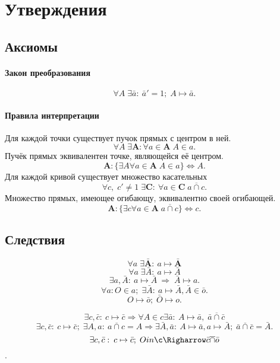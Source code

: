 \section{Утверждения}

\subsection{Аксиомы}
\paragraph{Закон преобразования}
$$\forall A \; \exists \bar a:\: \bar a' =1;\; A \mapsto \bar a.$$

\paragraph{Правила интерпретации}
Для каждой точки существует пучок прямых с центром в ней.
$$\forall A \; \exists \mathbf{A}: \forall a \in \mathbf{A} \; A \in a.$$
Пучёк прямых эквивалентен точке, являющейся её центром.
$$\mathbf{A}:\{ \exists A \forall a \in \mathbf{A} \; A \in a \} \Leftrightarrow A.$$
Для каждой кривой существует множество касательных
$$\forall c,\; c'\ne 1 \; \exists \mathbf{C} :\: \forall a \in \mathbf{C} \; a \overline\cap c.$$
Множество прямых, имеющее огибающу, эквивалентно своей огибающей.
$$\mathbf{A}:\{\exists c \forall a \in \mathbf{A} \; a \overline\cap c\} \Leftrightarrow c.$$

\subsection{Следствия}
$$\forall a \; \exists \mathbf{\bar A} :\: a \mapsto \mathbf{\bar A}$$
$$\forall a \; \exists \bar A: \: a \mapsto \bar A$$
$$\exists a,\bar A: \: a \mapsto \bar A \: \Rightarrow \; \bar A \mapsto a.$$
$$\forall a: O \in a; \; \exists \bar A :\: a \mapsto \bar A, \bar A \in \bar o.$$
$$O \mapsto \bar o;\; \bar O \mapsto o.$$

$$\exists c, \bar c:\: c \mapsto \bar c \Rightarrow \forall A \in c \exists \bar a:\: A \mapsto \bar a,\; \bar a \overline\cap \bar c$$
$$\exists c, \bar c:\: c \mapsto \bar c;\; \exists A, a:\: a \overline\cap c = A \Rightarrow \exists \bar A, \bar a:\: A\mapsto \bar a, a \mapsto \bar A;\; \bar a \overline\cap \bar c = \bar A.$$
$$\exists c, \bar c:\: c \mapsto \bar c;\; O in \c \Righarrow \bar c \overline\cap \bar o$$.
